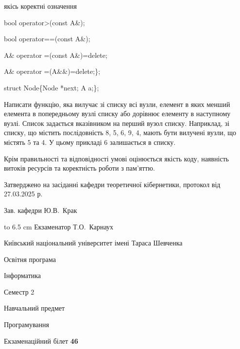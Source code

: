 \documentclass[12pt, ukrainian]{article}
\begin{document}
{\quad  якісь коректні означення 

\quad  bool operator>(const A\&); 

\quad  bool operator==(const A\&); 

\quad A\& operator =(const A\&)=delete; 

\quad  A\& operator =(A\&\&)=delete;\};

struct Node\{Node *next; A a;\};

 Написати функцію, яка вилучає зі списку всі вузли, елемент в яких менший елемента в попередньому вузлі списку або дорівнює елементу в наступному вузлі. Список задається вказівником на перший вузол списку. Наприклад, зі списку, що містить послідовність 8, 5, 6, 9, 4, мають бути вилучені вузли, що містять 5 та 4. У цьому прикладі 6 залишається в списку.

Крім правильності та відповідності умові оцінюється якість коду, наявність витоків ресурсів та коректність роботи з пам'яттю. 

}
{\smallskip\smallskip \begin {scriptsize} Затверджено на засіданні кафедри теоретичної кібернетики, протокол   від   27.03.2025 р.\par\smallskip\smallskip\smallskip\smallskip
{\parbox {6.5 cm} {Зав. кафедри \dotfill Ю.В.~Крак}}\hspace {0.7cm} {\hbox to 6.5 cm { Екзаменатор \dotfill Т.О.~Карнаух}} \end{scriptsize}}
\newpage
{{\begin {scriptsize}\par
{ \center  Київський національний університет імені Тараса Шевченка \par}
{\parbox {5 cm}{Освітня програма \hfill}{\parbox {7 cm}{Інформатика\hfill}}\parbox {6 cm}{\hfill Семестр 2}}\par
{\parbox {5 cm} {Навчальний предмет \hfill}\parbox {7 cm}{Програмування \hfill}\parbox {6cm}{\hfill}\par}\vspace{-15pt} \end{scriptsize}}{\center Екзаменаційний білет \No \textbf { 46 }\par}}
\end{document}
